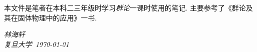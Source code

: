     本文件是笔者在本科二三年级时学习\emph{群论}一课时使用的笔记. 主要参考了《群论及其在固体物理中的应用》\cite{Xu1994}一书.

    \vspace{2cm}
    \begin{flushright}
        \textit{林海轩} \\[1em]
        \textit{复旦大学\ \today}
    \end{flushright}
